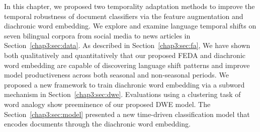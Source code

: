 In this chapter, we proposed two temporality adaptation methods to improve the temporal robustness of document classifiers via the feature augmentation and diachronic word embedding.
We explore and examine language temporal shifts on seven bilingual corpora from social media to news articles in Section~\ref{chap3:sec:data}. 
As described in Section~\ref{chap3:sec:fa}, We have shown both qualitatively and quantitatively that our proposed FEDA and diachronic word embedding are capable of discovering language shift patterns and improve model productiveness across both seasonal and non-seasonal periods.
We proposed a new framework to train diachronic word embedding via a subword mechanism in Section~\ref{chap3:sec:dwe}.
Evaluations using a clustering task of word analogy show preeminence of our proposed DWE model.
The Section~\ref{chap3:sec:model} presented a new time-driven classification model that encodes documents through the diachronic word embedding. 
